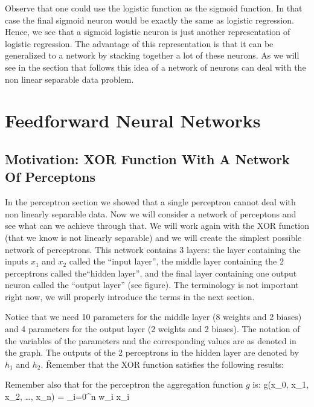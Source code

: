 Observe that one could use the logistic function as the sigmoid function. In that case the final sigmoid neuron would
be exactly the same as logistic regression. Hence, we see that a sigmoid logistic neuron is just another
representation of logistic regression. The advantage of this representation is that it can be generalized to a
network by stacking together a lot of these neurons. As we will see in the section that follows this idea of a
network of neurons can deal with the non linear separable data problem.

\section{Feedforward Neural Networks}

\subsection{Motivation: XOR Function With A Network Of Perceptons}

In the perceptron section we showed that a single perceptron cannot deal with non linearly separable data. Now we
will consider a network of perceptons and see what can we achieve through that. We will work again with the XOR
function (that we know is not linearly separable) and we will create the simplest possible network of perceptrons.
This network contains 3 layers: the layer containing the inputs $x_1$ and $x_2$ called the ``input layer'', the
middle layer containing the 2 perceptrons called the``hidden layer'', and the final layer containing one output
neuron called the ``output layer'' (see figure). The terminology is not important right now, we will properly
introduce the terms in the next section.


Notice that we need 10 parameters for the middle layer (8 weights and 2 biases) and 4 parameters for the output layer
(2 weights and 2 biases). The notation of the variables of the parameters and the corresponding values are as denoted
in the graph. The outputs of the 2 perceptrons in the hidden layer are denoted by $h_1$ and $h_2$. \v

Remember that the XOR function satisfies the following results:


\vspace{-5pt}

Remember also that for the perceptron the aggregation function $g$ is:
\bse
g(x_0, x_1, x_2, \ldots, x_n) = \sum_{i=0}^{n} w_i x_i
\ese

